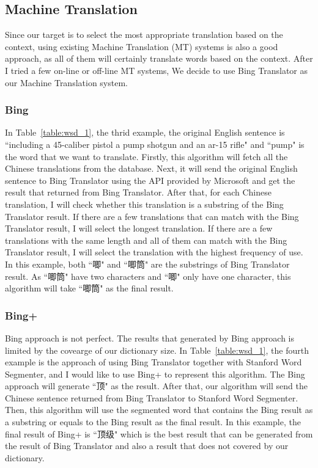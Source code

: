 \begin{CJK}{UTF8}{gbsn}
\subsection{Machine Translation}
Since our target is to select the most appropriate translation based on the context, using existing Machine Translation (MT) systems is also a good approach, as all of them will certainly translate words based on the context. After I tried a few on-line or off-line MT systems, We decide to use Bing Translator as our Machine Translation system.

\subsubsection{Bing}
In Table~\ref{table:wsd_1}, the thrid example, the original English sentence is ``including a 45-caliber pistol a pump shotgun and an ar-15 rifle" and ``pump" is the word that we want to translate. Firstly, this algorithm will fetch all the Chinese translations from the database. Next, it will send the original English sentence to Bing Translator using the API provided by Microsoft and get the result that returned from Bing Translator. After that, for each Chinese translation, I will check whether this translation is a substring of the Bing Translator result. If there are a few translations that can match with the Bing Translator result, I will select the longest translation. If there are a few translations with the same length and all of them can match with the Bing Translator result, I will select the translation with the highest frequency of use. In this example, both ``唧" and ``唧筒" are the substrings of Bing Translator result. As ``唧筒" have two characters and ``唧" only have one character, this algorithm will take ``唧筒" as the final result.

\subsubsection{Bing+}
Bing approach is not perfect. The results that generated by Bing approach is limited by the covearge of our dictionary size. In Table~\ref{table:wsd_1}, the fourth example is the approach of using Bing Translator together with Stanford Word Segmenter, and I would like to use Bing+ to represent this algorithm. The Bing approach will generate ``顶" as the result. After that, our algorithm will send the Chinese sentence returned from Bing Translator to Stanford Word Segmenter. Then, this algorithm will use the segmented word that contains the Bing result as a substring or equals to the Bing result as the final result. In this example, the final result of Bing+ is ``顶级" which is the best result that can be generated from the result of Bing Translator and also a result that does not covered by our dictionary.


\end{CJK}
